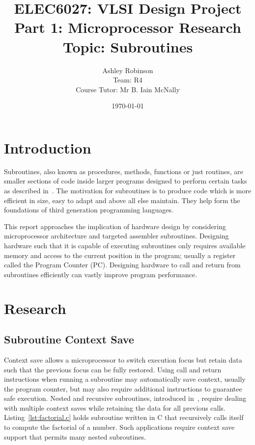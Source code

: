 \documentclass[12pt,a4paper]{article}
\title{ELEC6027: VLSI Design Project \\Part 1: Microprocessor Research\\Topic: Subroutines}
\author{Ashley Robinson\\ Team: R4\\Course Tutor: Mr B. Iain McNally}
\date{\today}
\begin{document}
\begin{titlepage}
\clearpage
\maketitle
\thispagestyle{empty}
\end{titlepage}

\tableofcontents
\clearpage

\lstset{
   frame=L,
   basicstyle=\footnotesize,        %
   captionpos=b
}


\section{Introduction}

Subroutines, also known as procedures, methods, functions or just routines, are smaller sections of code inside larger programs designed to perform certain tasks as described in~\cite{alison}.
The motivation for subroutines is to produce code which is more efficient in size, easy to adapt and above all else maintain. 
They help form the foundations of third generation programming languages.

This report approaches the implication of hardware design by considering microprocessor architecture and targeted assembler subroutines.
Designing hardware such that it is capable of executing subroutines only requires available memory and access to the current position in the program; usually a register called the Program Counter (PC).
Designing hardware to call and return from subroutines efficiently can vastly improve program performance. 


\section{Research}

\subsection{Subroutine Context Save }
Context save allows a microprocessor to switch execution focus but retain data such that the previous focus can be fully restored.
Using call and return instructions when running a subroutine may automatically save context, usually the program counter, but may also require additional instructions to guarantee safe execution.
Nested and recursive subroutines, introduced in~\cite{IainPrograms}, require dealing with multiple context saves while retaining the data for all previous calls. 
Listing~\ref{lst:factorial.c} holds subroutine written in C that recursively calls itself to compute the factorial of a number.
Such applications require context save support that permits many nested subroutines.
\end{document}
